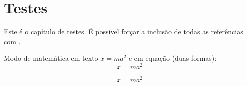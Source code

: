 \chapter{Testes}\label{ch:testes}

Este é o capítulo de testes.
É possível forçar a inclusão de todas as referências com \cite{*}.

Modo de matemática em texto $x = ma^2$ e em equação (duas formas):
\[
    x = ma^2
\]

\begin{equation}
    x = ma^2
\end{equation}
